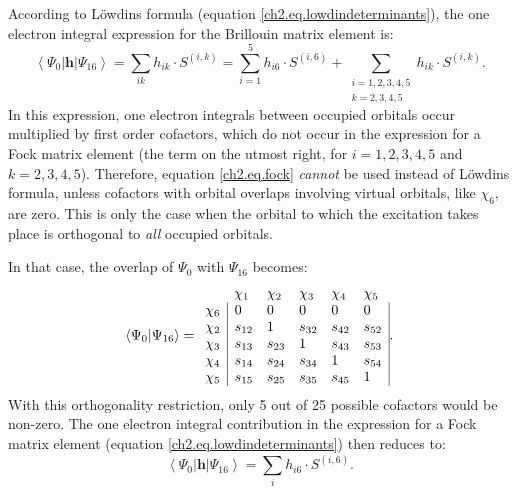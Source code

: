 According to L\"{o}wdins formula (equation \ref{ch2.eq.lowdindeterminants}), the one electron integral expression for the Brillouin matrix element is:
\begin{equation}
\left< \Psi_0 | \mathbf{h} | \Psi_{16} \right> = \sum_{ik} h_{ik} \cdot S^{(i,k)} = \sum_{i=1}^5 h_{i6} \cdot S^{(i,6)} + \sum_{\substack{i=1,2,3,4,5\\k=2,3,4,5}} h_{ik} \cdot S^{(i,k)}. 
\label{ch2.eq.lowdinsingdet}
\end{equation}
In this expression, one electron integrals between occupied orbitals occur multiplied by first order cofactors, which do not occur in the expression for a Fock matrix element (the term on the utmost right, for $i=1,2,3,4,5$ and $k=2,3,4,5$). Therefore, equation \ref{ch2.eq.fock} \textit{cannot} be used instead of L\"{o}wdins formula, unless cofactors with orbital overlaps involving virtual orbitals, like $\chi_6$, are zero. This is only the case when the orbital to which the excitation takes place is orthogonal to \textit{all} occupied orbitals.

In that case, the overlap of $\Psi_0$ with $\Psi_{16}$ becomes:
\begin{equation}
\left < \Psi_0 | \Psi_{16} \right> =
\begin{array}{llllll}
 &  \chi_1 & \chi_2 & \chi_3 & \chi_4 & \chi_5 \\
 \chi_6 & \multicolumn{1}{|l}{ 0 } & 0 & 0 & 0 & \multicolumn{1}{l|}{ 0 } \\
 \chi_2 & \multicolumn{1}{|l}{ s_{12} } & 1 & s_{32} & s_{42} & \multicolumn{1}{l|}{ s_{52} } \\
 \chi_3 & \multicolumn{1}{|l}{ s_{13} } & s_{23} & 1 & s_{43} & \multicolumn{1}{l|}{ s_{53} } \\
 \chi_4 & \multicolumn{1}{|l}{ s_{14} } & s_{24} & s_{34} & 1 & \multicolumn{1}{l|}{ s_{54} } \\
 \chi_5 & \multicolumn{1}{|l}{ s_{15} } & s_{25} & s_{35} & s_{45} & \multicolumn{1}{l|}{ 1 }
\end{array}.
\label{ch2.eq.s016go}
\end{equation}
With this orthogonality restriction, only 5 out of 25 possible cofactors would be non-zero. The one electron integral contribution in the expression for a Fock matrix element (equation \ref{ch2.eq.lowdindeterminants}) then reduces to:
\begin{equation}
\left< \Psi_0 | \mathbf{h} | \Psi_{16} \right> = \sum_{i} h_{i6} \cdot S^{(i,6)}.
\label{ch2.eq.lowdinwithorth}
\end{equation}

